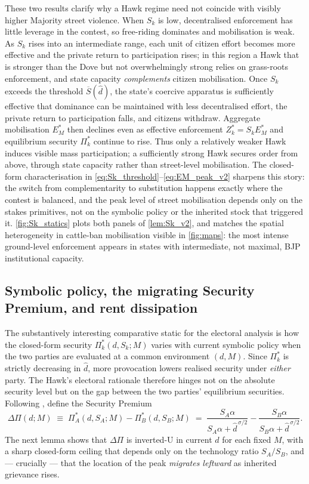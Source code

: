 \documentclass[11pt,twoside]{extarticle}
\begin{document}
These two results clarify why a Hawk regime need not coincide with visibly higher Majority street violence. When $S_k$ is low, decentralised enforcement has little leverage in the contest, so free-riding dominates and mobilisation is weak. As $S_k$ rises into an intermediate range, each unit of citizen effort becomes more effective and the private return to participation rises; in this region a Hawk that is stronger than the Dove but not overwhelmingly strong relies on grass-roots enforcement, and state capacity \emph{complements} citizen mobilisation. Once $S_k$ exceeds the threshold $\overline S(\hat d)$, the state's coercive apparatus is sufficiently effective that dominance can be maintained with less decentralised effort, the private return to participation falls, and citizens withdraw. Aggregate mobilisation $E_M^*$ then declines even as effective enforcement $Z_k^*=S_k E_M^*$ and equilibrium security $\Pi_k^*$ continue to rise. Thus only a relatively weaker Hawk induces visible mass participation; a sufficiently strong Hawk secures order from above, through state capacity rather than street-level mobilisation. The closed-form characterisation in \autoref{eq:Sk_threshold}--\autoref{eq:EM_peak_v2} sharpens this story: the switch from complementarity to substitution happens exactly where the contest is balanced, and the peak level of street mobilisation depends only on the stakes primitives, not on the symbolic policy or the inherited stock that triggered it. \autoref{fig:Sk_statics} plots both panels of \autoref{lem:Sk_v2}, and matches the spatial heterogeneity in cattle-ban mobilisation visible in \autoref{fig:maps}: the most intense ground-level enforcement appears in states with intermediate, not maximal, BJP institutional capacity.

\subsection{Symbolic policy, the migrating Security Premium, and rent dissipation}

The substantively interesting comparative static for the electoral analysis is how the closed-form security $\Pi_k^*(d,S_k;M)$ varies with current symbolic policy when the two parties are evaluated at a common environment $(d,M)$. Since $\Pi_k^*$ is strictly decreasing in $\hat d$, more provocation lowers realised security under \emph{either} party. The Hawk's electoral rationale therefore hinges not on the absolute security level but on the gap between the two parties' equilibrium securities. Following \citet{barutSymmetricMultiplePrize1998}, define the Security Premium
\begin{equation}\label{eq:security_premium_d}
    \Delta\Pi(d;M)\;\equiv\;\Pi_A^*(d,S_A;M)-\Pi_B^*(d,S_B;M)
    \;=\;\frac{S_A\alpha}{S_A\alpha+\hat d^{\,\sigma/2}}-\frac{S_B\alpha}{S_B\alpha+\hat d^{\,\sigma/2}}.
\end{equation}
The next lemma shows that $\Delta\Pi$ is inverted-U in current $d$ for each fixed $M$, with a sharp closed-form ceiling that depends only on the technology ratio $S_A/S_B$, and — crucially — that the location of the peak \emph{migrates leftward} as inherited grievance rises.
\end{document}
